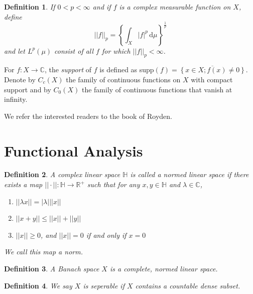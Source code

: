 \documentclass[12pt]{report}
\newtheorem{definition}{Definition}
\numberwithin{definition}{section}
\begin{document}
\begin{definition}
  If $0 < p < \infty$ and if $f$ is a complex measurable function on $X$, define
  \[
    ||f||_{p} = \left\{ \int_{ X} \! |f|^{p} \, \mathrm{d}\mu  \right\}^{\frac{1}{p}}
  \] 
  and let $L^{p}(\mu)$ consist of all $f$ for which $||f||_{p} < \infty$.
\end{definition}

For $ f : X \to \mathbb{C} $, the \textit{support} of $f$ is defined as supp$(f) = \overline{\left\{ x \in X; f(x) \not = 0 \right\}} $.
Denote by $C_{c}(X)$ the family of continuous functions on $X$ with compact support and by $C_{0}(X)$ the family of continuous functions that vanish at infinity.

We refer the interested readers to the book of Royden\cite{royden}.


\break



\section{Functional Analysis}

\begin{definition}
A complex linear space $\mathbb{H}$ is called a \textit{normed linear space} if there exists a map $|| \cdot || : \mathbb{H} \to \mathbb{R}^{+} $ such that for any $x, y \in \mathbb{H}$ and $ \lambda \in \mathbb{C}$,

\begin{enumerate}
  \item $|| \lambda x || = |\lambda| || x ||$
  \item $|| x + y || \leq || x || + || y ||  $
  \item $|| x || \geq 0$, and $|| x || = 0$ if and only if $x = 0$
\end{enumerate}

We call this map a norm.
\end{definition}

\begin{definition}
  A Banach space $X$ is a complete, normed linear space.
\end{definition}

\begin{definition}
  We say $X$ is seperable if $X$ contains a countable dense subset.
\end{definition}
\end{document}
